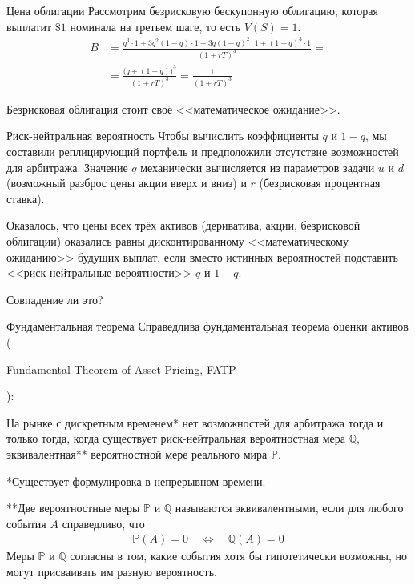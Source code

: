 \documentclass{beamer}
\newcommand{\en}[1]{\begin{otherlanguage}{english}#1\end{otherlanguage}}
\begin{document}
\begin{frame}{Цена облигации}
\justify
Рассмотрим безрисковую бескупонную облигацию, которая выплатит $\$1$ номинала на третьем шаге, то есть $V(S) = 1$.
\begin{align*}
B &= \frac{q^3 \cdot 1 + 3q^2(1-q) \cdot 1 + 3q(1-q)^2 \cdot 1 + (1-q)^3 \cdot 1}{(1+rT)^3} = \\
&= \frac{\Big(q + (1-q) \Big)^3}{(1+rT)^3} = \frac{1}{(1+rT)^3}
\end{align*}

\justify
Безрисковая облигация стоит своё <<математическое ожидание>>.
\end{frame}



\begin{frame}{Риск-нейтральная вероятность}
\justify
Чтобы вычислить коэффициенты $q$ и $1-q$, мы составили реплицирующий портфель и предположили отсутствие возможностей для арбитража. Значение $q$ механически вычисляется из параметров задачи $u$ и $d$ (возможный разброс цены акции вверх и вниз) и $r$ (безрисковая процентная ставка).

\justify
Оказалось, что цены всех трёх активов (дериватива, акции, безрисковой облигации) оказались равны дисконтированному <<математическому ожиданию>> будущих выплат, если вместо истинных вероятностей подставить <<риск-нейтральные вероятности>> $q$ и $1-q$.

\justify
Совпадение ли это?
\end{frame}



\begin{frame}{Фундаментальная теорема}
\justify
Справедлива \alert{фундаментальная теорема оценки активов} (\en{Fundamental Theorem of Asset Pricing, FATP}):

\justify
На рынке с дискретным временем* нет возможностей для арбитража тогда и только тогда, когда существует риск-нейтральная вероятностная мера $\mathbb{Q}$, эквивалентная** вероятностной мере реального мира $\mathbb{P}$.

\justify
*Существует формулировка в непрерывном времени.

\justify
**Две вероятностные меры $\mathbb{P}$ и $\mathbb{Q}$ называются эквивалентными, если для любого события $A$ справедливо, что
\begin{align*}
\mathbb{P}(A)=0 \quad \Leftrightarrow \quad \mathbb{Q}(A)=0
\end{align*}
Меры $\mathbb{P}$ и $\mathbb{Q}$ согласны в том, какие события хотя бы гипотетически возможны, но могут присваивать им разную вероятность.
\end{frame}
\end{document}
